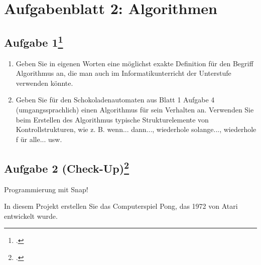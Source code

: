 \documentclass{lehramt-informatik}
\begin{document}
\chapter{Aufgabenblatt 2: Algorithmen}

%

\section{Aufgabe 1\footcite{oomup:ab:2}}

\begin{enumerate}


\item Geben Sie in eigenen Worten eine möglichst exakte Definition für
den Begriff Algorithmus an, die man auch im Informatikunterricht der
Unterstufe verwenden könnte.


\item Geben Sie für den Schokoladenautomaten aus Blatt 1 Aufgabe 4
(umgangssprachlich) einen Algorithmus für sein Verhalten an. Verwenden
Sie beim Erstellen des Algorithmus typische Strukturelemente von
Kontrollstrukturen, wie z. B. wenn... dann..., wiederhole solange...,
wiederhole f ür alle... usw.
\end{enumerate}

%

\section{Aufgabe 2 (Check-Up)\footcite{oomup:ab:2}}

Programmierung mit Snap!

In diesem Projekt erstellen Sie das Computerspiel Pong, das 1972 von
Atari entwickelt wurde.
\end{document}
